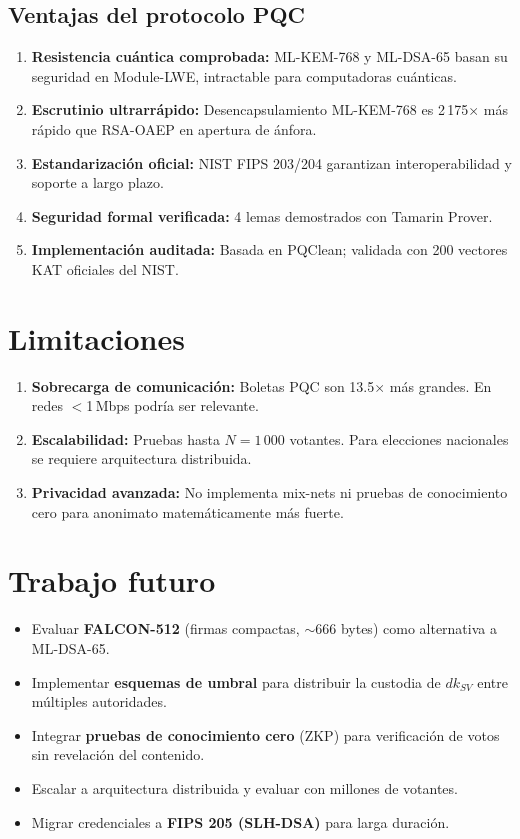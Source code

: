 \documentclass[12pt,a4paper,twoside,openright]{book}
\theoremstyle{plain}
\theoremstyle{definition}
\theoremstyle{remark}
\begin{document}
\subsection{Ventajas del protocolo PQC}

\begin{enumerate}
  \item \textbf{Resistencia cu\'antica comprobada:} ML-KEM-768 y ML-DSA-65
    basan su seguridad en Module-LWE, intractable para computadoras cu\'anticas.
  \item \textbf{Escrutinio ultrarrápido:} Desencapsulamiento ML-KEM-768 es
    2\,175$\times$ m\'as r\'apido que RSA-OAEP en apertura de \'anfora.
  \item \textbf{Estandarizaci\'on oficial:} NIST FIPS 203/204 garantizan
    interoperabilidad y soporte a largo plazo.
  \item \textbf{Seguridad formal verificada:} 4 lemas demostrados con
    Tamarin Prover.
  \item \textbf{Implementaci\'on auditada:} Basada en PQClean; validada con
    200 vectores KAT oficiales del NIST.
\end{enumerate}

\section{Limitaciones}

\begin{enumerate}
  \item \textbf{Sobrecarga de comunicaci\'on:} Boletas PQC son 13.5$\times$
    m\'as grandes. En redes $<$1\,Mbps podr\'ia ser relevante.
  \item \textbf{Escalabilidad:} Pruebas hasta $N=1\,000$ votantes. Para
    elecciones nacionales se requiere arquitectura distribuida.
  \item \textbf{Privacidad avanzada:} No implementa mix-nets ni pruebas de
    conocimiento cero para anonimato matem\'aticamente m\'as fuerte.
\end{enumerate}

\section{Trabajo futuro}

\begin{itemize}
  \item Evaluar \textbf{FALCON-512} (firmas compactas, $\sim$666 bytes) como
    alternativa a ML-DSA-65.
  \item Implementar \textbf{esquemas de umbral} para distribuir la custodia de
    $dk_{SV}$ entre m\'ultiples autoridades.
  \item Integrar \textbf{pruebas de conocimiento cero} (ZKP) para verificaci\'on
    de votos sin revelaci\'on del contenido.
  \item Escalar a arquitectura distribuida y evaluar con millones de votantes.
  \item Migrar credenciales a \textbf{FIPS 205 (SLH-DSA)} para larga duraci\'on.
\end{itemize}
\end{document}
